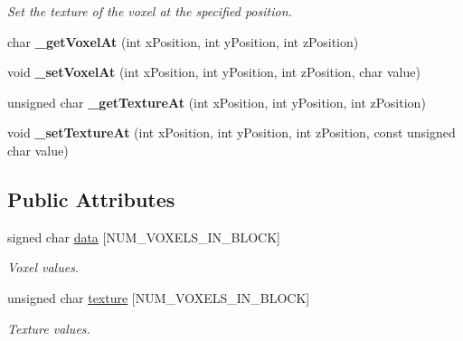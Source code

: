 \begin{DoxyCompactItemize}
\begin{DoxyCompactList}\small\item\em \-Set the texture of the voxel at the specified position. \end{DoxyCompactList}\item 
\hypertarget{classVoxelBlockLoaded_a2c3d0312ccea4227115b006061ce8882}{
char {\bfseries \-\_\-get\-Voxel\-At} (int x\-Position, int y\-Position, int z\-Position)}
\label{d0/df8/classVoxelBlockLoaded_a2c3d0312ccea4227115b006061ce8882}

\item 
\hypertarget{classVoxelBlockLoaded_a9788f8467a9904eb17e25ed9fbd16dbb}{
void {\bfseries \-\_\-set\-Voxel\-At} (int x\-Position, int y\-Position, int z\-Position, char value)}
\label{d0/df8/classVoxelBlockLoaded_a9788f8467a9904eb17e25ed9fbd16dbb}

\item 
\hypertarget{classVoxelBlockLoaded_ae07a4c7a7d1c476a7eb32c066647eab2}{
unsigned char {\bfseries \-\_\-get\-Texture\-At} (int x\-Position, int y\-Position, int z\-Position)}
\label{d0/df8/classVoxelBlockLoaded_ae07a4c7a7d1c476a7eb32c066647eab2}

\item 
\hypertarget{classVoxelBlockLoaded_aa6aac23ce37590ab632a4760048aa64d}{
void {\bfseries \-\_\-set\-Texture\-At} (int x\-Position, int y\-Position, int z\-Position, const unsigned char value)}
\label{d0/df8/classVoxelBlockLoaded_aa6aac23ce37590ab632a4760048aa64d}

\end{DoxyCompactItemize}
\subsection*{\-Public \-Attributes}
\begin{DoxyCompactItemize}
\item 
\hypertarget{classVoxelBlockLoaded_a9ea7dc2206d5ff1a545bcfdb3ef20d6e}{
signed char \hyperlink{classVoxelBlockLoaded_a9ea7dc2206d5ff1a545bcfdb3ef20d6e}{data} \mbox{[}\-N\-U\-M\-\_\-\-V\-O\-X\-E\-L\-S\-\_\-\-I\-N\-\_\-\-B\-L\-O\-C\-K\mbox{]}}
\label{d0/df8/classVoxelBlockLoaded_a9ea7dc2206d5ff1a545bcfdb3ef20d6e}

\begin{DoxyCompactList}\small\item\em \-Voxel values. \end{DoxyCompactList}\item 
\hypertarget{classVoxelBlockLoaded_a1eb14b44a18266615605c6310f420ddf}{
unsigned char \hyperlink{classVoxelBlockLoaded_a1eb14b44a18266615605c6310f420ddf}{texture} \mbox{[}\-N\-U\-M\-\_\-\-V\-O\-X\-E\-L\-S\-\_\-\-I\-N\-\_\-\-B\-L\-O\-C\-K\mbox{]}}
\label{d0/df8/classVoxelBlockLoaded_a1eb14b44a18266615605c6310f420ddf}

\begin{DoxyCompactList}\small\item\em \-Texture values. \end{DoxyCompactList}\end{DoxyCompactItemize}



